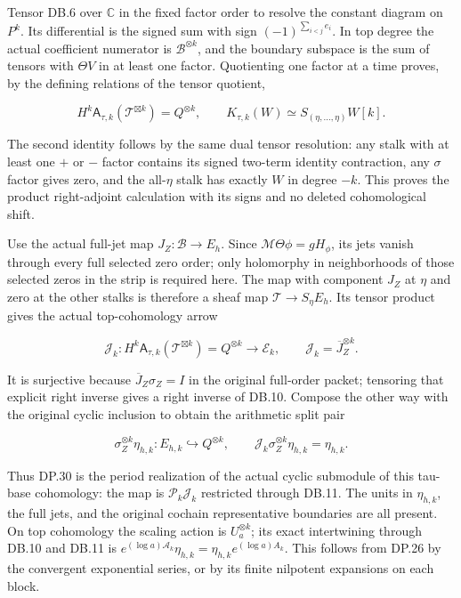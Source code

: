 \documentclass{article}
\begin{document}
Tensor DB.6 over \(\mathbb C\) in the fixed factor order to resolve the constant diagram on \(P^k\). Its differential is the signed sum with sign \((-1)^{\sum_{i<j}e_i}\). In top degree the actual coefficient numerator is \(\mathscr B^{\otimes k}\), and the boundary subspace is the sum of tensors with \(\Theta V\) in at least one factor. Quotienting one factor at a time proves, by the defining relations of the tensor quotient,

\[
H^k\mathsf A_{\tau,k}(\mathcal T^{\boxtimes k})
=Q^{\otimes k},\qquad
K_{\tau,k}(W)\simeq S_{(\eta,\ldots,\eta)}W[k].
\tag{DB.9}
\]

The second identity follows by the same dual tensor resolution: any stalk with at least one \(+\) or \(-\) factor contains its signed two-term identity contraction, any \(\sigma\) factor gives zero, and the all-\(\eta\) stalk has exactly \(W\) in degree \(-k\). This proves the product right-adjoint calculation with its signs and no deleted cohomological shift.

Use the actual full-jet map \(J_Z:\mathscr B\to E_h\). Since \(\mathcal M\Theta\phi=gH_\phi\), its jets vanish through every full selected zero order; only holomorphy in neighborhoods of those selected zeros in the strip is required here. The map with component \(J_Z\) at \(\eta\) and zero at the other stalks is therefore a sheaf map \(\mathcal T\to S_\eta E_h\). Its tensor product gives the actual top-cohomology arrow

\[
\mathcal J_k:
H^k\mathsf A_{\tau,k}(\mathcal T^{\boxtimes k})=Q^{\otimes k}
\longrightarrow\mathcal E_k,
\qquad\mathcal J_k=\overline J_Z^{\otimes k}.
\tag{DB.10}
\]

It is surjective because \(\overline J_Z\sigma_Z=I\) in the original full-order packet; tensoring that explicit right inverse gives a right inverse of DB.10. Compose the other way with the original cyclic inclusion to obtain the arithmetic split pair

\[
\sigma_Z^{\otimes k}\eta_{h,k}:E_{h,k}\hookrightarrow Q^{\otimes k},
\qquad
\mathcal J_k\sigma_Z^{\otimes k}\eta_{h,k}=\eta_{h,k}.
\tag{DB.11}
\]

Thus DP.30 is the period realization of the actual cyclic submodule of this tau-base cohomology: the map is \(\mathscr P_k\mathcal J_k\) restricted through DB.11. The units in \(\eta_{h,k}\), the full jets, and the original cochain representative boundaries are all present. On top cohomology the scaling action is \(U_a^{\otimes k}\); its exact intertwining through DB.10 and DB.11 is \(e^{(\log a)\mathcal A_k}\eta_{h,k}=\eta_{h,k}e^{(\log a)A_k}\). This follows from DP.26 by the convergent exponential series, or by its finite nilpotent expansions on each block.
\end{document}
